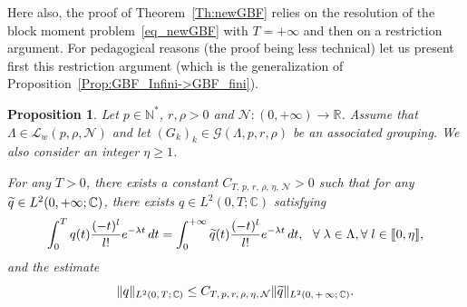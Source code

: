 \documentclass[11pt]{article}
\newtheorem{prop}[theo]{Proposition}
\theoremstyle{definition}
\numberwithin{equation}{section}
\numberwithin{figure}{section}
\numberwithin{table}{section}
\newcommand{\llbracket}{\mathopen{[\mkern -2.7mu[}}
\newcommand{\rrbracket}{\mathclose{]\mkern -2.7mu]}}
\newcommand{\inter}[2]{\llbracket #1,#2 \rrbracket}
\newcommand{\LL}{\mathcal{L}}
\newcommand{\NN}{\mathcal{N}}
\newcommand{\N}{\mathbb{N}}
\newcommand{\R}{\mathbb{R}}
\newcommand{\C}{\mathbb{C}}
\let\oldtilde\tilde
\renewcommand*{\tilde}[1]{\mathchoice{\widetilde{#1}}{\widetilde{#1}}{\oldtilde{#1}}{\oldtilde{#1}}}\let\oldexists\exists
\renewcommand*{\exists}{\mathrel{\oldexists}}
\let\oldforall\forall
\renewcommand*{\forall}{\mathrel{\oldforall}}
\begin{document}
Here also, the proof of Theorem~\ref{Th:newGBF} relies on the resolution of the block moment problem~\eqref{eq_newGBF} with $T=+\infty$ and then on a restriction argument. For pedagogical reasons (the proof being less technical) let us present first this restriction argument (which is the generalization of Proposition~\ref{Prop:GBF_Infini->GBF_fini}).

\begin{prop}\label{Prop:newGBF_Infini->GBF_fini}
Let $p \in \N^*$, $r, \rho > 0$ and $\NN : (0,+\infty) \to \R$. Assume that $\Lambda \in \LL_w(p,\rho, \NN)$ and let $(G_k)_k\in \mathcal{G}(\Lambda,p,r,\rho)$ be an associated grouping. We also consider an integer $\eta\geq 1$.

For any $T>0$, there exists a constant $C_{T,\, p,\, r,\, \rho,\, \eta,\, \NN} >0$ such that for any $\tilde{q}\in L^2(0,+\infty;\C)$, there exists $q\in L^2(0,T;\C)$ satisfying
\[
\int_0^{T} q(t) \frac{(-t)^l}{l!} e^{-\lambda t} \, dt = \int_0^{+\infty} \tilde{q}(t) \frac{(-t)^l}{l!} e^{-\lambda t} \, dt, \ \ \forall \lambda\in \Lambda, \forall l\in \inter{0}{\eta},
\]
and the estimate
\[
\|q\|_{L^2(0,\,T;\,\C)}\leq C_{T,\, p,\, r,\, \rho, \,\eta,\, \NN} \|\tilde{q}\|_{L^2(0,\,+\,\infty;\,\C)}.
\]
\end{prop}
\end{document}
